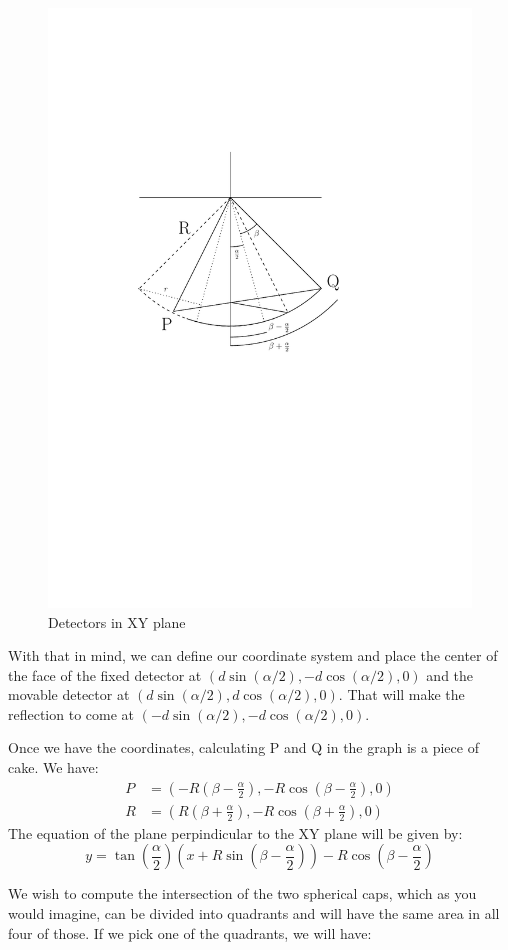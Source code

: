 \documentclass{double}
\begin{document}
\begin{multicols*}{2}
\begin{figure}[H]
    \centering
    \includegraphics[width=0.6\columnwidth]{images/diag.pdf}
    \caption{Detectors in XY plane}
    \label{diag}
\end{figure}

With that in mind, we can define our coordinate system and
place the center of the face of the fixed detector at
$(d\sin(\alpha/2), -d\cos(\alpha/2), 0)$ and the movable
detector at $(d\sin(\alpha/2), d\cos(\alpha/2), 0)$. That will
make the reflection to come at $(-d\sin(\alpha/2),
-d\cos(\alpha/2), 0)$.

Once we have the coordinates, calculating P and Q in the
graph is a piece of cake. We have:
\begin{align}
    P &= (-R(\beta-\frac{\alpha}{2}),
    -R\cos(\beta-\frac{\alpha}{2}), 0) \\
    R &= (R(\beta+\frac{\alpha}{2}),
    -R\cos(\beta+\frac{\alpha}{2}), 0)
\end{align}
\noindent The equation of the plane perpindicular to the XY
plane will be given by:
\begin{equation}
    y =
    \tan(\frac{\alpha}{2})(x+R\sin(\beta-\frac{\alpha}{2})) -
    R\cos(\beta-\frac{\alpha}{2})
\end{equation}

We wish to compute the intersection of the two spherical
caps, which as you would imagine, can be divided into
quadrants and will have the same area in all four of those.
If we pick one of the quadrants, we will have:


\end{multicols*}
\end{document}

